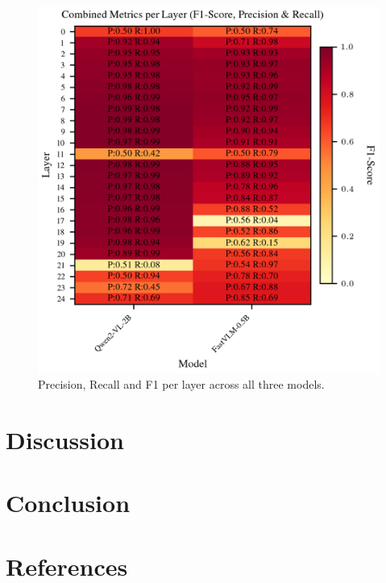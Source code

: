 \documentclass[11pt]{article}
\begin{document}
\begin{figure}[H]
    \centering
    \includegraphics[width=1\linewidth]{figures/global/_combined_exp1/combined_metrics_heatmap.png}
    \caption{Precision, Recall and F1 per layer across all three models.}
    \label{fig:combined_metrics_per_layer}
\end{figure}






\section{Discussion}
\section{Conclusion}

\section{References}

\nocite{Ando2005,augenstein-etal-2016-stance,andrew2007scalable,rasooli-tetrault-2015,goodman-etal-2016-noise,harper-2014-learning}
\end{document}
